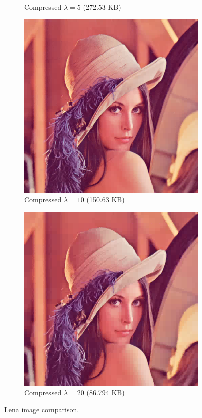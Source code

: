 \documentclass[12pt]{article}
\theoremstyle{definition}
\begin{document}
\begin{figure}
\begin{subfigure}[t]{.485\linewidth}
      \caption{Compressed \(\lambda = 5\) (272.53 KB)}
    \end{subfigure}
    \begin{subfigure}[t]{.485\linewidth}
      \centering
      \includegraphics[width=.93\linewidth]{figs/lena_haar_10.png}
      \caption{Compressed \(\lambda = 10\) (150.63 KB)}
    \end{subfigure}
    \begin{subfigure}[t]{.485\linewidth}
      \centering
      \includegraphics[width=.93\linewidth]{figs/lena_haar_20.png}
      \caption{Compressed \(\lambda = 20\) (86.794 KB)}
    \end{subfigure}
    \caption{Lena image comparison.}
    \label{fig:lena}
  \end{figure}
\end{document}
